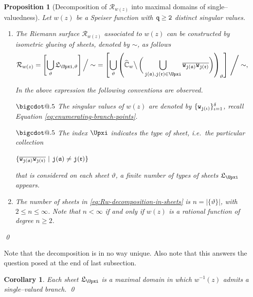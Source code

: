 \documentclass[final,3p,times]{elsarticle}
\makeatletter
\newcommand{\CW}{\ensuremath{{\widehat{\mathbb C}}}}
\newcommand{\R}{\ensuremath{{\mathcal R}}}
\newcommand{\abs}[1]{\left\lvert#1\right\rvert}
\newcommand{\msigma}{\ensuremath{{\mathfrak{a}}}}
\newcommand{\mrho}{\ensuremath{{\mathfrak{r}}}}
\newcommand*\bigcdot{\mathpalette\bigcdot@{.5}}
\newcommand*\bigcdot@[2]{\mathbin{\vcenter{\hbox{\scalebox{#2}{$\m@th#1\bullet$}}}}}
\newtheorem{corollary}[theorem]{Corollary}
\newtheorem{proposition}[theorem]{Proposition}
\theoremstyle{definition}
\makeatother
\begin{document}
\begin{proposition}[Decomposition of $\R_{w(z)}$ into maximal domains of single--valuedness]
\label{prop:Rw-is-a-union-of-sheets}
Let $w(z)$ be a Speiser function with $\tt q \geq 2$ 
distinct singular values.

\begin{enumerate}[label=\arabic*),leftmargin=*]

\item 
The Riemann surface $\R_{w(z)}$ 
associated to $w(z)$
can be constructed by 
isometric glueing of sheets, denoted by $\sim$,  as follows
\begin{equation}
\label{eq:Rw-decomposition-in-sheets}
\R_{w(z)} 
= \left[ \bigcup_\vartheta \mathfrak{L}_{\Upxi,\vartheta} \right]
\Big/ \sim \ = 
\left[
\bigcup_\vartheta \left( \CW_w \big\backslash \, 
\bigg(\bigcup\limits_{
{\tt j}( \msigma ) , {\tt j}( \mrho ) \in  \Upxi 
} 
\overline{ {\tt w}_{{\tt j}( \msigma )} 
{\tt w}_{{\tt j}( \mrho )} } \bigg)
\right)_\vartheta 
\right]  \, \Bigg/ \sim ,
\end{equation}

\noindent
In the above expression the following conventions are observed.

\noindent
$\bigcdot$
The singular values 
of $w(z)$
are denoted by $ \{{\tt w}_{{\tt j} (\iota) } \}_{\iota=1}^\delta $,
recall Equation \eqref{eq:enumerating-branch-points}.

\noindent
$\bigcdot$
The index $\Upxi$
indicates  the type of sheet, {\it i.e.}\ 
the particular collection  

\centerline{
$\{ \overline{ {\tt w}_{{\tt j}( \msigma ) } 
{\tt w}_{{\tt j}( \mrho )} } \ \vert\ 
{\tt j}( \msigma ) \neq {\tt j}( \mrho )\}$ 
}

\noindent
that is considered on each sheet $\vartheta$,
a finite number of 
types of sheets 
$\mathfrak{L}_\Upxi$ appears.

\item 
The number of sheets in 
\eqref{eq:Rw-decomposition-in-sheets} is 
$n=\abs{ \{\vartheta\} }$, with $2 \leq n \leq \infty$.
Note that $n < \infty$ if and only if 
$w(z)$ is a rational function of 
degree $n \geq 2$. 
\end{enumerate}
\hfill 
\qed
\end{proposition}

Note that the decomposition is in no way unique.
Also note that this answers the question posed at the end of last subsection. 

\begin{corollary}
\label{cor:sheet-is-maximal-domain}
Each sheet $\mathfrak{L}_{\Upxi}$ is a maximal domain in which $w^{-1}(z)$ admits a single--valued branch.
\qed
\end{corollary}
\end{document}
